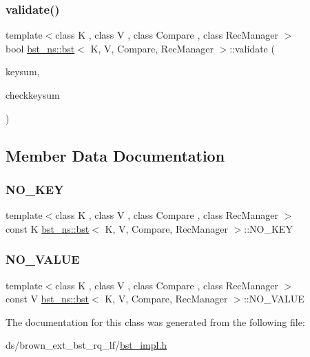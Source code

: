 \mbox{\label{classbst__ns_1_1bst_a019ec02bfcc4eb12a6b1e9e06ea82fe6}} 
\subsubsection{\texorpdfstring{validate()}{validate()}}
{\footnotesize\ttfamily template$<$class K , class V , class Compare , class Rec\+Manager $>$ \\
bool \hyperlink{classbst__ns_1_1bst}{bst\+\_\+ns\+::bst}$<$ K, V, Compare, Rec\+Manager $>$\+::validate (\begin{DoxyParamCaption}\item[{const long long}]{keysum,  }\item[{const bool}]{checkkeysum }\end{DoxyParamCaption})}



\subsection{Member Data Documentation}
\mbox{\label{classbst__ns_1_1bst_a29f9c4bcd6b3196ee4c7664caa4ddfc1}} 
\subsubsection{\texorpdfstring{N\+O\+\_\+\+K\+EY}{NO\_KEY}}
{\footnotesize\ttfamily template$<$class K , class V , class Compare , class Rec\+Manager $>$ \\
const K \hyperlink{classbst__ns_1_1bst}{bst\+\_\+ns\+::bst}$<$ K, V, Compare, Rec\+Manager $>$\+::N\+O\+\_\+\+K\+EY}

\mbox{\label{classbst__ns_1_1bst_af1520d0c3d203a1b4e8d1967092662a5}} 
\subsubsection{\texorpdfstring{N\+O\+\_\+\+V\+A\+L\+UE}{NO\_VALUE}}
{\footnotesize\ttfamily template$<$class K , class V , class Compare , class Rec\+Manager $>$ \\
const V \hyperlink{classbst__ns_1_1bst}{bst\+\_\+ns\+::bst}$<$ K, V, Compare, Rec\+Manager $>$\+::N\+O\+\_\+\+V\+A\+L\+UE}



The documentation for this class was generated from the following file\+:\begin{DoxyCompactItemize}
\item 
ds/brown\+\_\+ext\+\_\+bst\+\_\+rq\+\_\+lf/\hyperlink{bst__impl_8h}{bst\+\_\+impl.\+h}\end{DoxyCompactItemize}
